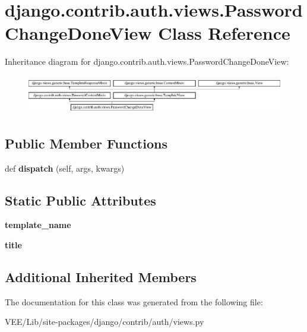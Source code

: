 \hypertarget{classdjango_1_1contrib_1_1auth_1_1views_1_1_password_change_done_view}{}\section{django.\+contrib.\+auth.\+views.\+Password\+Change\+Done\+View Class Reference}
\label{classdjango_1_1contrib_1_1auth_1_1views_1_1_password_change_done_view}
Inheritance diagram for django.\+contrib.\+auth.\+views.\+Password\+Change\+Done\+View\+:\begin{figure}[H]
\begin{center}
\leavevmode
\includegraphics[height=1.717791cm]{classdjango_1_1contrib_1_1auth_1_1views_1_1_password_change_done_view}
\end{center}
\end{figure}
\subsection*{Public Member Functions}
\begin{DoxyCompactItemize}
\item 
\mbox{\label{classdjango_1_1contrib_1_1auth_1_1views_1_1_password_change_done_view_a94d70a0b04a85915afbeb4c3d768085f}} 
def {\bfseries dispatch} (self, args, kwargs)
\end{DoxyCompactItemize}
\subsection*{Static Public Attributes}
\begin{DoxyCompactItemize}
\item 
\mbox{\label{classdjango_1_1contrib_1_1auth_1_1views_1_1_password_change_done_view_adc6035a0bc7181cee9ded05e7e1ce920}} 
{\bfseries template\+\_\+name}
\item 
\mbox{\label{classdjango_1_1contrib_1_1auth_1_1views_1_1_password_change_done_view_a0cb382e0535a2017b62b1cbf0cca8481}} 
{\bfseries title}
\end{DoxyCompactItemize}
\subsection*{Additional Inherited Members}


The documentation for this class was generated from the following file\+:\begin{DoxyCompactItemize}
\item 
V\+E\+E/\+Lib/site-\/packages/django/contrib/auth/views.\+py\end{DoxyCompactItemize}
